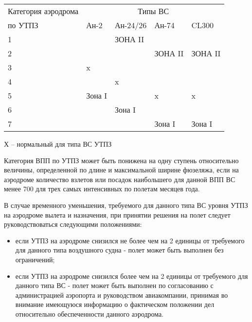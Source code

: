 \begin{table}[H]
    \begin{center}
    \caption{} \label{tbl:04T5}
    \small
    \begin{tabular}{|p{}|p{}|p{}|p{}|p{}|}
    \hline
    Категория аэродрома  &\multicolumn{4}{c|}{Типы ВС} \\
    \cline{2-5}
    по УТПЗ                     &Ан-2   &Ан-24/26   &Ан-74  &CL300\\
    \hline    
    1                           &       &  ЗОНА II  &       &       \\\hline
    2                           &       &           &ЗОНА II&ЗОНА II\\\hline
    3                           &x      &           &       &       \\\hline
    4                           &       &x          &       &       \\\hline
    5                           &Зона I &           &x      &x      \\\hline
    6                           &       &Зона I     &       &       \\\hline
    7                           &       &           &Зона I &Зона I \\
    \hline\hline
    \end{tabular}
    \end{center}
\end{table}
Х – нормальный для типа ВС УТПЗ

Категория ВПП по УТПЗ может быть понижена на одну ступень относительно величины, определенной по длине и максимальной ширине фюзеляжа, если на аэродроме количество взлетов или посадок наибольшего для данной ВПП ВС менее 700 для трех самых интенсивных по полетам месяцев года.

В случае временного уменьшения, требуемого для данного типа ВС уровня УТПЗ на аэродроме вылета и назначения, при принятии решения на полет следует руководствоваться следующими положениями:
\begin{itemize}
    \item если УТПЗ на аэродроме снизился не более чем на 2 единицы от требуемого для данного типа воздушного судна - полет может быть выполнен без ограничений;
    \item если УТПЗ на аэродроме снизился более чем на 2 единицы от требуемого для данного типа ВС - полет может быть выполнен по согласованию с администрацией аэропорта и руководством авиакомпании, принимая во внимание имеющуюся информацию о фактическом положении дел относительно обеспеченности данного аэродрома.
\end{itemize}
	
